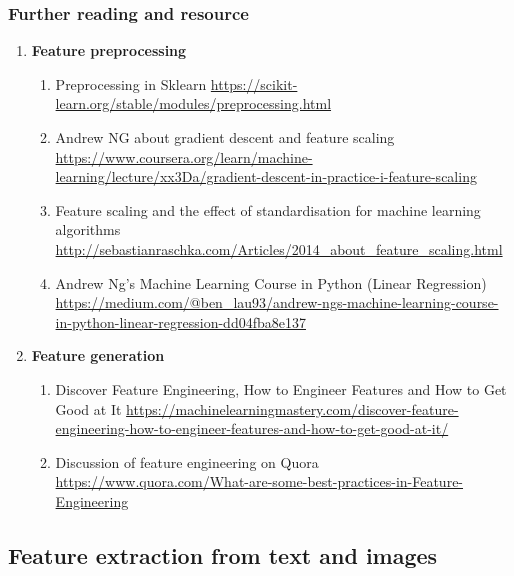 \documentclass[11pt, twoside]{article}   	%
\begin{document}
\subsubsection{Further reading and resource}
\renewcommand{\labelenumii}{\alph{enumii}}
\begin{enumerate}
  \item \textbf{Feature preprocessing}
    \begin{enumerate}
      \item Preprocessing in Sklearn \url{https://scikit-learn.org/stable/modules/preprocessing.html}
      \item Andrew NG about gradient descent and feature scaling \url{https://www.coursera.org/learn/machine-learning/lecture/xx3Da/gradient-descent-in-practice-i-feature-scaling}
      \item Feature scaling and the effect of standardisation for machine learning algorithms \url{http://sebastianraschka.com/Articles/2014_about_feature_scaling.html}
      \item {Andrew Ng’s Machine Learning Course in Python (Linear Regression)} \url{https://medium.com/@ben_lau93/andrew-ngs-machine-learning-course-in-python-linear-regression-dd04fba8e137}

    \end{enumerate}
  \item \textbf{Feature generation}
    \begin{enumerate}
      \item  Discover Feature Engineering, How to Engineer Features and How to Get Good at It \url{https://machinelearningmastery.com/discover-feature-engineering-how-to-engineer-features-and-how-to-get-good-at-it/}
      \item  Discussion of feature engineering on Quora \url{https://www.quora.com/What-are-some-best-practices-in-Feature-Engineering}           

    \end{enumerate}
  \end{enumerate}





\subsection{ Feature extraction from text and images}
\end{document}
